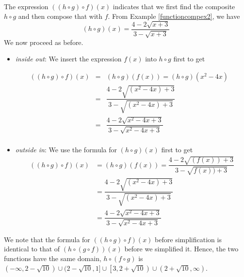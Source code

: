 {\medskip  

The expression $((h \circ g) \circ f)(x)$ indicates that we first find the composite $h \circ g$ and then compose that with $f$.  From Example \ref{functioncompex2}, we have \[(h \circ g)(x) = \frac{4-2\sqrt{x+3}}{3-\sqrt{x+3}}\]  We now proceed as before.

\begin{itemize}

\item  \textit{inside out}: We insert the expression $f(x)$ into $h \circ g$ first to get 

\[ \begin{array}{rclr}
((h \circ g) \circ f)(x) & = & (h \circ g)(f(x)) = (h \circ g)\left(x^2-4x\right) & \\ [2pt]
                         & = & \dfrac{4-2\sqrt{\left(x^2-4x\right)+3}}{3-\sqrt{\left(x^2-4x\right)+3}} & \\ [12pt]
                         & = & \dfrac{4 - 2\sqrt{x^2-4x+3}}{3 - \sqrt{x^2-4x+3}} & \\ \end{array}\]

\item  \textit{outside in}:  We use the formula for $(h \circ g)(x)$ first to get
\begin{align*}
((h \circ g) \circ f)(x) & = (h \circ g)(f(x))=\dfrac{4-2\sqrt{(f(x))+3}}{3-\sqrt{f(x))+3}}\\
 & = \dfrac{4 - 2\sqrt{\left(x^2-4x\right)+3}}{3 - \sqrt{\left(x^2-4x\right)+3}}\\
 & = \dfrac{4 - 2\sqrt{x^2-4x+3}}{3 - \sqrt{x^2-4x+3}}
 \end{align*}
 
 \end{itemize}

 
We note that the formula for $((h \circ g) \circ f)(x)$ before simplification is identical to that of $(h \circ (g \circ f))(x)$ before we simplified it.  Hence, the two functions have the same domain, $h \circ (f \circ g)$ is $(-\infty, 2 -\sqrt{10}) \cup (2 - \sqrt{10}, 1] \cup \left[3, 2 + \sqrt{10}\right) \cup \left(2+\sqrt{10}, \infty\right)$. 
}

\medskip




